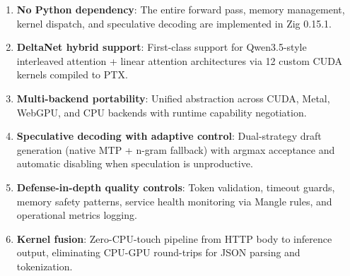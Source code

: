\documentclass[11pt]{article}
\begin{document}
\begin{enumerate}
  \item \textbf{No Python dependency}: The entire forward pass, memory management,
        kernel dispatch, and speculative decoding are implemented in Zig 0.15.1.
  \item \textbf{DeltaNet hybrid support}: First-class support for Qwen3.5-style
        interleaved attention + linear attention architectures via 12 custom
        CUDA kernels compiled to PTX.
  \item \textbf{Multi-backend portability}: Unified abstraction across CUDA,
        Metal, WebGPU, and CPU backends with runtime capability negotiation.
  \item \textbf{Speculative decoding with adaptive control}: Dual-strategy draft
        generation (native MTP + n-gram fallback) with argmax acceptance and
        automatic disabling when speculation is unproductive.
  \item \textbf{Defense-in-depth quality controls}: Token validation, timeout
        guards, memory safety patterns, service health monitoring via Mangle
        rules, and operational metrics logging.
  \item \textbf{Kernel fusion}: Zero-CPU-touch pipeline from HTTP body to
        inference output, eliminating CPU-GPU round-trips for JSON parsing
        and tokenization.
\end{enumerate}
\end{document}
